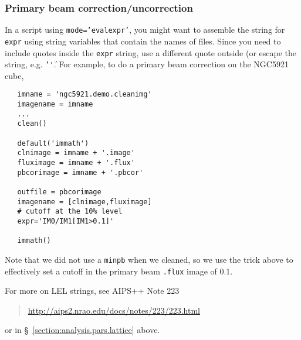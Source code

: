 \subsubsection{Primary beam correction/uncorrection}
\label{section:analysis.immath.examples.pbcor}

In a script using {\tt mode='evalexpr'}, you might want to assemble
the string for {\tt expr} using string variables that contain
the names of files.  Since you need to include quotes inside the
{\tt expr} string, use a different quote outside (or escape the
string, e.g. {\tt '\''}.
For example, to do a primary beam correction on the NGC5921 cube,
\small
\begin{verbatim}
   imname = 'ngc5921.demo.cleanimg'
   imagename = imname
   ...
   clean()

   default('immath')
   clnimage = imname + '.image'
   fluximage = imname + '.flux'
   pbcorimage = imname + '.pbcor'

   outfile = pbcorimage
   imagename = [clnimage,fluximage]
   # cutoff at the 10% level
   expr='IM0/IM1[IM1>0.1]'

   immath()
\end{verbatim}
\normalsize
Note that we did not use a {\tt minpb} when we cleaned, so we use the
trick above to effectively set a cutoff in the primary beam 
{\tt .flux} image of 0.1.

For more on LEL strings, see AIPS++ Note 223 
\begin{quote}
   \url{http://aips2.nrao.edu/docs/notes/223/223.html}
\end{quote}
or in \S~\ref{section:analysis.pars.lattice} above.


